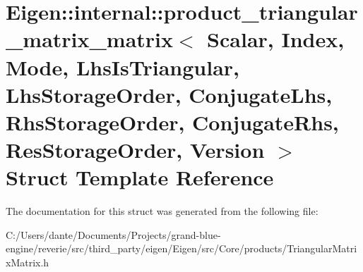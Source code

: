 \hypertarget{struct_eigen_1_1internal_1_1product__triangular__matrix__matrix}{}\section{Eigen\+::internal\+::product\+\_\+triangular\+\_\+matrix\+\_\+matrix$<$ Scalar, Index, Mode, Lhs\+Is\+Triangular, Lhs\+Storage\+Order, Conjugate\+Lhs, Rhs\+Storage\+Order, Conjugate\+Rhs, Res\+Storage\+Order, Version $>$ Struct Template Reference}
\label{struct_eigen_1_1internal_1_1product__triangular__matrix__matrix}


The documentation for this struct was generated from the following file\+:\begin{DoxyCompactItemize}
\item 
C\+:/\+Users/dante/\+Documents/\+Projects/grand-\/blue-\/engine/reverie/src/third\+\_\+party/eigen/\+Eigen/src/\+Core/products/Triangular\+Matrix\+Matrix.\+h\end{DoxyCompactItemize}
